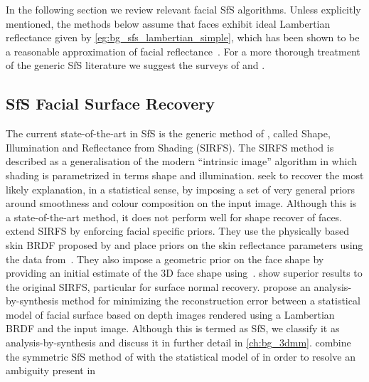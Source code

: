 In the following section we review relevant facial SfS algorithms. Unless
explicitly mentioned, the methods below assume that faces exhibit ideal
Lambertian reflectance given by \cref{eg:bg_sfs_lambertian_simple},
which has been shown to be a reasonable approximation
of facial reflectance~\cite{Sirovich:1987te,georghiades2001fromfew,%
Basri:2003ie,turk1991eigenfaces,Hallinan:1994dz,ramamoorthi2002analytic,%
ramamoorthi2001relationship,shashua1997photometric,moses1993face}. For a more
thorough treatment of the generic SfS literature we suggest the surveys
of \citet{zhang1999shape} and \citet{durou2008numerical}.
\subsection{SfS Facial Surface Recovery}
The current state-of-the-art in SfS is the generic method of
\citet{barron2015shape}, called
Shape, Illumination and Reflectance from Shading (SIRFS). The SIRFS method is
described as a generalisation of the modern ``intrinsic image'' algorithm in
which shading is parametrized in terms shape and illumination.
\citet{barron2015shape} seek to recover the most likely explanation, in a
statistical sense, by imposing a set of very general priors around smoothness
and colour composition on the input image. Although this is a state-of-the-art
method, it does not perform well for shape recover of faces.
\citet{li2014intrinsic} extend SIRFS by enforcing facial specific priors. They
use the physically based skin BRDF proposed by \citet{weyrich2006analysis} and
place priors on the skin reflectance parameters using the data
from~\cite{weyrich2006analysis}. They also impose a geometric prior on the face
shape by providing an initial estimate of the 3D face shape
using~\cite{Yang:2011gj}. \citet{li2014intrinsic} show superior results to the
original SIRFS, particular for surface normal recovery.
\citet{atick1996statistical} propose an analysis-by-synthesis method
for minimizing the reconstruction error between a statistical model of facial
surface based on depth images rendered using a Lambertian BRDF and the input
image. Although this is termed as SfS, we classify it as analysis-by-synthesis
and discuss it in further detail in \cref{ch:bg_3dmm}.
\citet{dovgard2004statistical} combine the symmetric SfS method of
\citet{yilmaz2002estimation} with the statistical model of
\citet{atick1996statistical} in order to resolve an ambiguity present in
